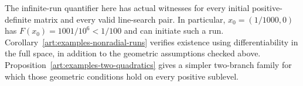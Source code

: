 The infinite-run quantifier here has actual witnesses for every initial
positive-definite matrix and every valid line-search pair. In particular,
$x_0=(1/1000,0)$ has $F(x_0)=1001/10^6<1/100$ and can initiate such a run.
Corollary~\ref{art:examples-nonradial-runs} verifies existence using
differentiability in the full space, in addition to the geometric assumptions
checked above. Proposition~\ref{art:examples-two-quadratics} gives a simpler
two-branch family for which those geometric conditions hold on every positive
sublevel.
